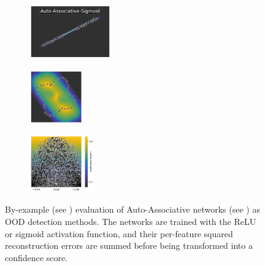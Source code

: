 \begin{figure}[H]
    \begin{subfigure}
        \centering
        \includegraphics[width=0.388\textwidth,valign=t]{ood-detection/figures/ood-detection/confidence-line-aa-sigmoid.pdf}
    \end{subfigure}
    \begin{subfigure}
        \centering
        \includegraphics[width=0.254\textwidth,valign=t]{ood-detection/figures/ood-detection/confidence-circle-aa-sigmoid.pdf}
    \end{subfigure}
    \begin{subfigure}
        \centering
        \includegraphics[width=0.308\textwidth,valign=t]{ood-detection/figures/ood-detection/confidence-haystack-aa-sigmoid.pdf}
    \end{subfigure}

    \caption[Comparison of Auto-Associative Networks as OOD detection methods]{By-example (see ) evaluation of Auto-Associative networks (see ) as OOD detection methods. The networks are trained with the ReLU or sigmoid activation function, and their per-feature squared reconstruction errors are summed before being transformed into a confidence score.}
    \label{fig:auto-associative-ood-detection}
\end{figure}

